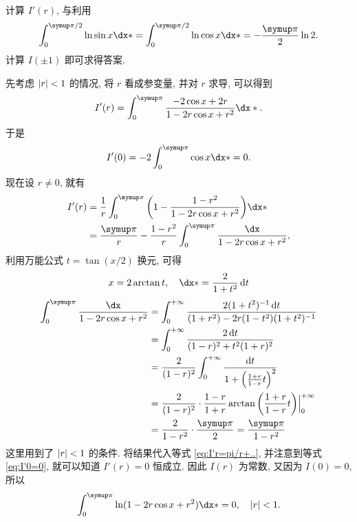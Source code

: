 \begin{exercise}[series=exer]
\begin{hint}
\begin{align*}
      \end{align*}
      计算 $ I'(r) $, 与利用
      \begin{align*}
          \int_{0}^{\pi/2} \ln \sin x \dx* = \int_{0}^{\pi/2} \ln \cos x\dx* = -\frac{\pi}{2}\ln 2.
      \end{align*}
      计算 $ I(\pm 1) $ 即可求得答案.
  \end{hint}
  \begin{answer}
    先考虑 $ \abs{r} < 1 $ 的情况, 将 $ r $ 看成参变量, 并对 $ r $ 求导, 可以得到
    \begin{align*}
      I'(r) = \int_{0}^{\pi} \frac{-2\cos x + 2r}{1 - 2r \cos x + r^{2}} \dx*.
    \end{align*}
    于是
    \begin{align}\label{eq:I'0=0}
      I'(0) = -2 \int_{0}^{\pi} \cos x \dx* = 0.
    \end{align}
    现在设 $ r \ne 0 $, 就有
    \begin{align}
      I'(r) & = \frac{1}{r} \int_{0}^{\pi} \qty(1 - \frac{1 - r^{2}}{1 - 2r \cos x + r^{2}}) \dx* \notag \\
      & = \frac{\pi}{r} - \frac{1 - r^{2}}{r} \int_{0}^{\pi} \frac{\dx}{1 - 2r \cos x + r^{2}}, \label{eq:I'r=pi/r+..}
    \end{align}
    利用万能公式 $ t = \tan(x/2) $ 换元, 可得
    \begin{align*}
      x = 2\arctan t,\quad \dx* = \frac{2}{1 + t^{2}} \dd{t}
    \end{align*}
    \begin{align*}
      \int_{0}^{\pi} \frac{\dx}{1 - 2r \cos x + r^{2}} 
      & = \int_{0}^{+\infty} \frac{2(1 + t^{2})^{-1}\dd{t}}{(1 + r^{2}) - 2r(1 - t^{2})(1 + t^{2})^{-1}} \\
      & = \int_{0}^{+\infty} \frac{2\dd{t}}{(1 - r)^{2} + t^{2}(1 + r)^{2}} \\
      & = \frac{2}{(1 - r)^{2}} \int_{0}^{+\infty} \frac{\dd t}{1 + \qty(\frac{1 + r}{1 - r}t)^{2}} \\
      & = \frac{2}{(1 - r)^{2}}\cdot \frac{1 - r}{1 + r} \arctan\qty(\frac{1 + r}{1 - r}t) \Big|_{0}^{+\infty} \\
      & = \frac{2}{1 - r^{2}} \cdot \frac{\pi}{2} = \frac{\pi}{1 - r^{2}}
    \end{align*}
    这里用到了 $ \abs{r} < 1 $ 的条件. 将结果代入等式 \eqref{eq:I'r=pi/r+..}, 并注意到等式 \eqref{eq:I'0=0}, 就可以知道 $ I'(r) = 0 $ 恒成立. 因此 $ I(r) $ 为常数, 又因为 $ I(0) = 0 $, 所以
    \begin{align*}
      \int_{0}^{\pi} \ln(1 - 2r \cos x + r^{2}) \dx* = 0,\quad \abs{r} < 1.
    \end{align*}


\end{answer}
\end{exercise}
